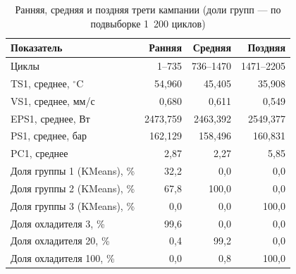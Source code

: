 \begin{table}[H]
\centering
\small
\caption{Ранняя, средняя и поздняя трети кампании (доли групп — по подвыборке 1~200 циклов)}\label{tab:drift}
\begin{tabular}{lrrr}
\toprule
Показатель & Ранняя & Средняя & Поздняя \\
\midrule
Циклы & 1--735 & 736--1470 & 1471--2205 \\
\midrule
TS1, среднее, $^\circ$C & 54,960 & 45,405 & 35,908 \\
VS1, среднее, мм/с & 0,680 & 0,611 & 0,549 \\
EPS1, среднее, Вт & 2473,759 & 2463,392 & 2549,377 \\
PS1, среднее, бар & 162,129 & 158,496 & 160,831 \\
PC1, среднее & 2,87 & \textminus{}2,27 & \textminus{}5,85 \\
\midrule
Доля группы 1 (KMeans), \% & 32,2 & 0,0 & 0,0 \\
Доля группы 2 (KMeans), \% & 67,8 & 100,0 & 0,0 \\
Доля группы 3 (KMeans), \% & 0,0 & 0,0 & 100,0 \\
\midrule
Доля охладителя 3, \% & 99,6 & 0,0 & 0,0 \\
Доля охладителя 20, \% & 0,4 & 99,2 & 0,0 \\
Доля охладителя 100, \% & 0,0 & 0,8 & 100,0 \\
\bottomrule
\end{tabular}
\end{table}
